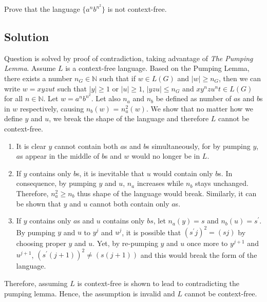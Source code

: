 Prove that the language $\{ a^n b^{n^2} \}$ is not context-free.

\subsection*{Solution}

Question is solved by proof of contradiction, taking advantage of \textit{The Pumping Lemma}.
Assume $L$ is a context-free language.
Based on the Pumping Lemma, there exists a number $n_G \in \mathbb{N}$ such that if $w \in L(G)$ and $|w| \geq n_G$, then we can write $w = xyzut$ such that $|y| \geq 1$ or $|u| \geq 1$, $|yzu| \leq n_G$ and $xy^nzu^nt \in L(G)$ for all $n \in \mathbb{N}$.
Let $w = a^nb^{n^2}$.
Let also $n_a$ and $n_b$ be defined as number of $a$s and $b$s in $w$ respectively, causing $n_b(w)$ = $n_a^2(w)$.
We show that no matter how we define $y$ and $u$, we break the shape of the language and therefore $L$ cannot be context-free.

\begin{enumerate}

	\item
	It is clear $y$ cannot contain both $a$s and $b$s simultaneously, for by pumping $y$, $a$s appear in the middle of $b$s and $w$ would no longer be in $L$.

	\item
	If $y$ contains only $b$s, it is inevitable that $u$ would contain only $b$s.
	In consequence, by pumping $y$ and $u$, $n_a$ increases while $n_b$ stays unchanged.
	Therefore, $n_a^2 \ge n_b$ thus shape of the language would break.
	Similarly, it can be shown that $y$ and $u$ cannot both contain only $a$s.

	\item
	If $y$ contains only $a$s and $u$ contains only $bs$, let $n_a(y) = s$ and $n_b(u) = s^\prime$.
	By pumping $y$ and $u$ to $y^j$ and $u^j$, it is possible that $(s^\prime j)^2 = (sj)$ by choosing proper $y$ and $u$.
	Yet, by re-pumping $y$ and $u$ once more to $y^{j+1}$ and $u^{j+1}$, $(s^\prime(j+1))^2 \neq (s(j+1))$ and this would break the form of the language.

\end{enumerate}

Therefore, assuming $L$ is context-free is shown to lead to contradicting the pumping lemma.
Hence, the assumption is invalid and $L$ cannot be context-free.
